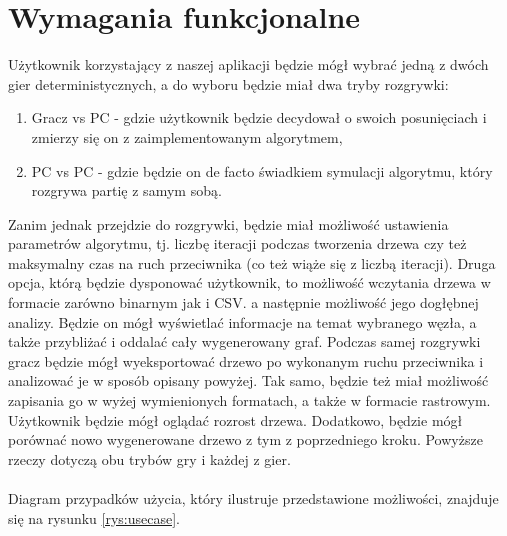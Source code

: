 \documentclass{article}
\let\oldsection\section
\renewcommand\section{\clearpage\oldsection}
\begin{document}
	\section{Wymagania funkcjonalne}
	Użytkownik korzystający z naszej aplikacji będzie mógł wybrać jedną z dwóch gier deterministycznych, a do wyboru będzie miał dwa tryby rozgrywki:
	\begin{enumerate}
		\item Gracz vs PC - gdzie użytkownik będzie decydował o swoich posunięciach i zmierzy się on z zaimplementowanym algorytmem,
		\item PC vs PC - gdzie będzie on de facto świadkiem symulacji algorytmu, który rozgrywa partię z samym sobą.\\
	\end{enumerate}
	Zanim jednak przejdzie do rozgrywki, będzie miał możliwość ustawienia parametrów algorytmu, tj. liczbę iteracji podczas tworzenia drzewa czy też maksymalny czas na ruch przeciwnika (co też wiąże się z liczbą iteracji).
	Druga opcja, którą będzie dysponować użytkownik, to możliwość wczytania drzewa w formacie zarówno binarnym jak i CSV.
	a następnie możliwość jego dogłębnej analizy. Będzie on mógł wyświetlać informacje na temat wybranego węzła, a także przybliżać i oddalać cały wygenerowany graf. Podczas samej rozgrywki gracz będzie mógł wyeksportować drzewo po wykonanym ruchu przeciwnika i analizować je w sposób opisany powyżej. Tak samo, będzie też miał możliwość zapisania go w wyżej wymienionych formatach, a także w formacie rastrowym. Użytkownik będzie mógł oglądać rozrost drzewa.
	Dodatkowo, będzie mógł porównać nowo wygenerowane drzewo z tym z poprzedniego kroku.  Powyższe rzeczy dotyczą obu trybów gry i każdej z gier. \\\\
	Diagram przypadków użycia, który ilustruje przedstawione możliwości, znajduje się na rysunku \ref{rys:usecase}.
\end{document}
